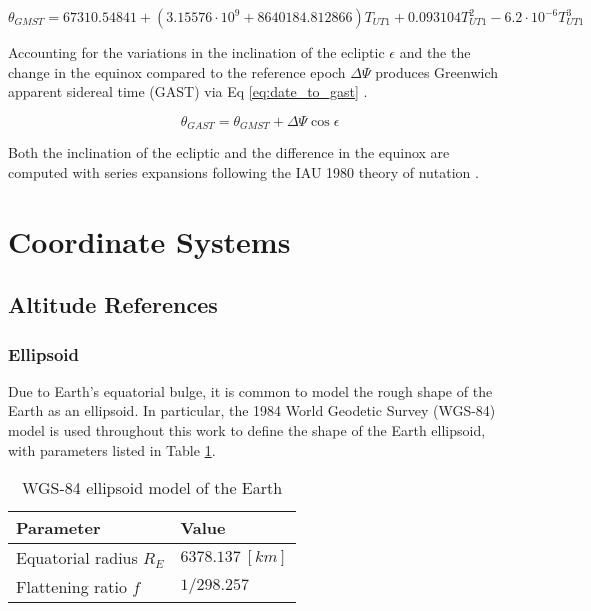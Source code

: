 \begin{equation} \label{eq:date_to_gmst}
  \theta_{GMST} = 67310.54841
        + \left(3.15576 \cdot 10^9 + 8640184.812866 \right) T_{UT1}
        + 0.093104 T_{UT1}^2
        - 6.2 \cdot 10^{-6} T_{UT1}^3
\end{equation}

Accounting for the variations in the inclination of the ecliptic $\epsilon$ and the the change in the equinox compared to the reference epoch $\Delta \Psi$ produces Greenwich apparent sidereal time (GAST) via Eq \ref{eq:date_to_gast} \cite{frueh2019notes}. 

\begin{equation} \label{eq:date_to_gast}
  \theta_{GAST} = \theta_{GMST} + \Delta \Psi \cos\epsilon
\end{equation}

Both the inclination of the ecliptic and the difference in the equinox are computed with series expansions following the IAU 1980 theory of nutation \cite{vallado4ed}.

\section{Coordinate Systems}

\subsection{Altitude References}

\subsubsection{Ellipsoid}

Due to Earth's equatorial bulge, it is common to model the rough shape of the Earth as an ellipsoid. In particular, the 1984 World Geodetic Survey (WGS-84) model is used throughout this work to define the shape of the Earth ellipsoid, with parameters listed in Table \ref{tb:wgs84}.

\begin{table}[]
  \centering
  \begin{tabular}{|l|l|}
  \hline
  \textbf{Parameter} & Value              \\ \hline
  Equatorial radius $R_E$             & $6378.137 \: [km]$ \\ \hline
  Flattening ratio $f$                & $1 / 298.257$      \\ \hline
  \end{tabular}
  \label{tb:wgs84}
  \caption{WGS-84 ellipsoid model of the Earth \cite{vallado4ed}}
\end{table}

